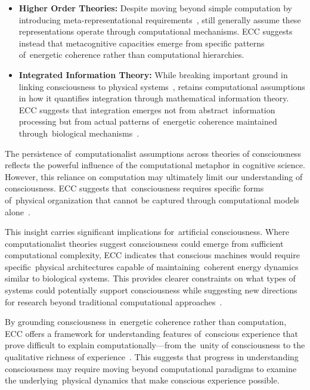 \begin{refsection}
\begin{itemize}
    \item \textbf{Higher Order Theories:} Despite moving beyond simple computation by introducing meta-representational requirements~\cite{Block2020}, still generally assume these representations operate through computational mechanisms. ECC suggests instead that metacognitive capacities emerge from specific patterns of~energetic coherence rather than computational hierarchies.

    \item \textbf{Integrated Information Theory:} While breaking important ground in linking consciousness to physical systems~\cite{Koch2018}, retains computational assumptions in how it quantifies integration through mathematical information theory. ECC suggests that integration emerges not from abstract~information processing but from actual patterns of~energetic coherence maintained through~biological mechanisms~\cite{Tononi2021}.
  \end{itemize}

  The persistence of~computationalist assumptions across theories of consciousness reflects the powerful influence of the computational metaphor in cognitive science. However, this reliance on computation may ultimately limit our understanding of consciousness. ECC suggests that~consciousness requires specific forms of~physical organization that cannot be captured through computational models alone~\cite{Dehaene2021, anderson2024physical}.

  This insight carries significant implications for~artificial consciousness. Where computationalist theories suggest consciousness could emerge from sufficient computational complexity, ECC indicates that conscious machines would require specific~physical architectures capable of maintaining~coherent energy dynamics similar to biological systems. This provides clearer constraints on what types of systems could potentially support consciousness while suggesting new directions for research beyond traditional computational approaches~\cite{seth2024conscious}.

  By grounding consciousness in~energetic coherence rather than computation, ECC offers a framework for understanding features of~conscious experience that prove difficult to explain computationally—from the~unity of consciousness to the qualitative richness of experience~\cite{Lamme2020}. This suggests that progress in understanding consciousness may require moving beyond computational paradigms to examine the underlying~physical dynamics that make conscious experience possible.


\end{refsection}
